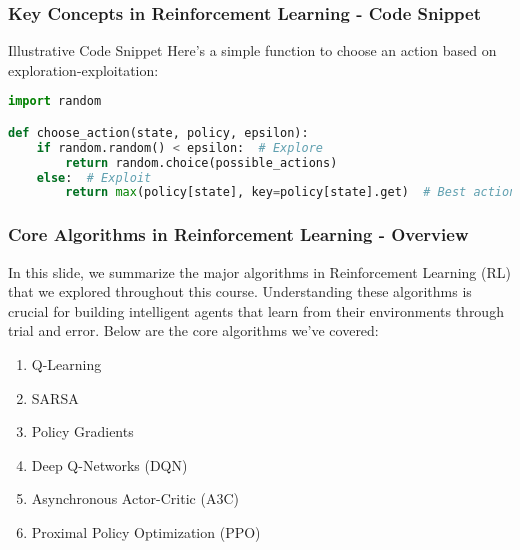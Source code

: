 \documentclass{beamer}
\begin{document}
\begin{frame}[fragile]
    \frametitle{Key Concepts in Reinforcement Learning - Code Snippet}
    \begin{block}{Illustrative Code Snippet}
    Here’s a simple function to choose an action based on exploration-exploitation:
    \begin{lstlisting}[language=Python]
import random

def choose_action(state, policy, epsilon):
    if random.random() < epsilon:  # Explore
        return random.choice(possible_actions)
    else:  # Exploit
        return max(policy[state], key=policy[state].get)  # Best action based on policy
    \end{lstlisting}
    \end{block}
\end{frame}

\begin{frame}[fragile]
    \frametitle{Core Algorithms in Reinforcement Learning - Overview}
    In this slide, we summarize the major algorithms in Reinforcement Learning (RL) that we explored throughout this course. Understanding these algorithms is crucial for building intelligent agents that learn from their environments through trial and error. Below are the core algorithms we've covered:
    \begin{enumerate}
        \item Q-Learning
        \item SARSA
        \item Policy Gradients
        \item Deep Q-Networks (DQN)
        \item Asynchronous Actor-Critic (A3C)
        \item Proximal Policy Optimization (PPO)
    \end{enumerate}
\end{frame}
\end{document}
